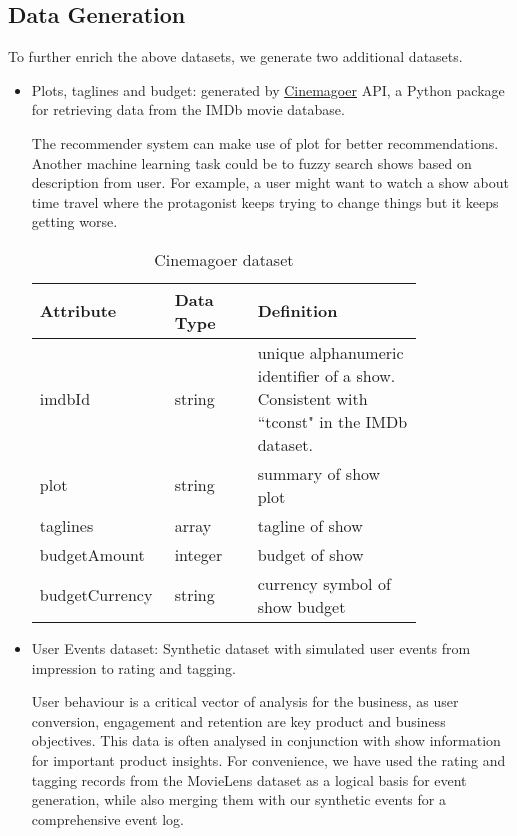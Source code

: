 \documentclass[10pt,titlepage]{article}
\begin{document}
\subsection{Data Generation}
To further enrich the above datasets, we generate two additional datasets.

\begin{itemize}
    \item Plots, taglines and budget: generated by \href{https://cinemagoer.github.io/}{Cinemagoer} API, a Python package
        for retrieving data from the IMDb movie database.

        The recommender system can make use of plot for better recommendations. Another machine learning task could be
        to fuzzy search shows based on description from user. For example, a user might want to watch a show about time
        travel where the protagonist keeps trying to change things but it keeps getting worse.

        \begin{table}[H]
            \centering
            \begin{tabular}{p{0.2\linewidth} | p{0.2\linewidth} | p{0.4\linewidth}}
                \hline
                \textbf{Attribute} & \textbf{Data Type}  & \textbf{Definition}\\
                \hline
                imdbId & string & unique alphanumeric identifier of a show. Consistent with ``tconst" in the IMDb dataset. \\
                \hline
                plot & string & summary of show plot \\
                \hline
                taglines & array & tagline of show \\
                \hline
                budgetAmount & integer & budget of show \\
                \hline
                budgetCurrency & string & currency symbol of show budget \\
                \hline
            \end{tabular}
            \caption{Cinemagoer dataset}
            \label{tab:cinemagoer}
        \end{table}

    \item User Events dataset: Synthetic dataset with simulated user events from impression to rating and tagging.

        User behaviour is a critical vector of analysis for the business, as user conversion, engagement and retention
        are key product and business objectives. This data is often analysed in conjunction with show information for
        important product insights. For convenience, we have used the rating and tagging records from the MovieLens
        dataset as a logical basis for event generation, while also merging them with our synthetic events for a
        comprehensive event log.


\end{itemize}
\end{document}
